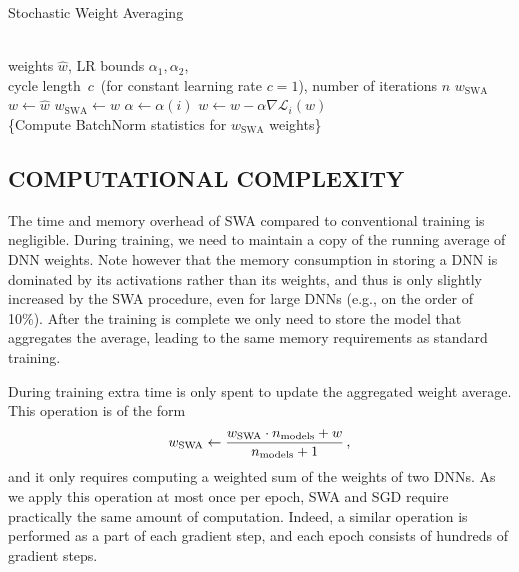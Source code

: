 \documentclass[letterpaper]{article}
\begin{document}
\begin{algorithm}[!t]
    \caption{Stochastic Weight Averaging}
    \label{alg:SWA}
\begin{algorithmic}
    \REQUIRE ~\\ weights $\hat w$, LR bounds $\alpha_1, \alpha_2$,\\ 
    cycle length~$c$~(for constant learning rate $c=1$), number of iterations $n$
    \ENSURE $w_{\text{SWA}}$ 
    \STATE $w \leftarrow \hat w$ 
    \STATE $w_{\text{SWA}} \leftarrow w$ 
        \STATE $\alpha \leftarrow \alpha(i)$ 
        \STATE $w \leftarrow w - \alpha \nabla \mathcal{L}_i(w)$ 
             
             
        \ENDIF
    \ENDFOR\\
    \{Compute BatchNorm statistics for $w_{\text{SWA}}$ weights\}
\end{algorithmic}
\end{algorithm}



\subsection{COMPUTATIONAL COMPLEXITY}
\label{sec:complexity}

The time and memory overhead of SWA compared to conventional training is negligible.
During training, we need to maintain a copy of the running average of DNN weights.
Note however that the memory consumption in storing a DNN 
is dominated by its activations rather than its weights, and thus is 
only slightly increased by the SWA procedure, even for large DNNs
(e.g., on the order of 10\%).
After the training is complete 
we only need to store the model that aggregates the average,
 leading to the same memory requirements
as standard training.

During training extra time is only spent to update the aggregated weight average.
This operation is of the form
\begin{align}
  \notag
  w_{\text{SWA}} \leftarrow \frac{w_{\text{SWA}} \cdot n_{\text{models}} + w}{n_{\text{models}} + 1} \,,
\end{align}
and it only requires computing a weighted sum of the weights of two DNNs. As we
apply this operation at most once per epoch, SWA and SGD require practically the same 
amount of computation. Indeed, a similar operation is performed as a part of each 
gradient step, and each epoch consists of hundreds of gradient steps. 
\end{document}
